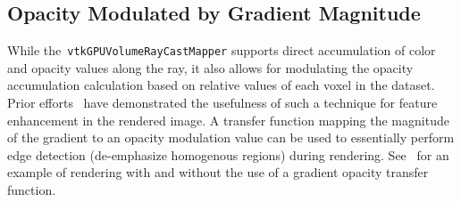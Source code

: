 \subsection{Opacity Modulated by Gradient Magnitude}
\label{opacity-modulated-by-gradient-magnitude}
While the~\texttt{vtkGPUVolumeRayCastMapper} supports direct accumulation of
color and opacity values along the ray, it also allows for modulating the
opacity accumulation calculation based on relative values of each voxel in the
dataset. Prior efforts~\citep{marchesin_per-pixel_2010} have demonstrated the
usefulness of such a technique for feature enhancement in the rendered image. A
transfer function mapping the magnitude of the gradient to an opacity modulation
value can be used to essentially perform edge detection (de-emphasize homogenous
regions) during rendering. See~ for an example of
rendering with and without the use of a gradient opacity transfer function.

